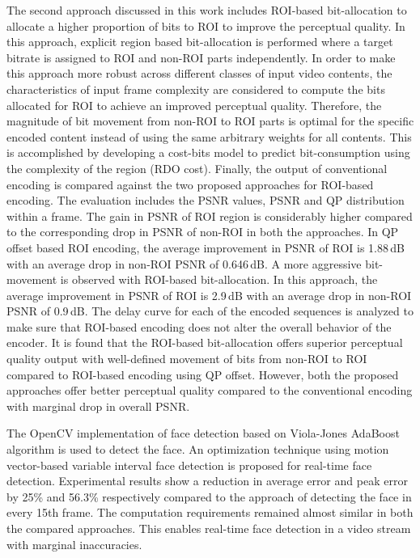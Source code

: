 The second approach discussed in this work includes ROI-based bit-allocation to allocate a higher proportion of bits to ROI to improve the perceptual quality. In this approach, explicit region based bit-allocation is performed where a target bitrate is assigned to ROI and non-ROI parts independently. In order to make this approach more robust across different classes of input video contents, the characteristics of input frame complexity are considered to compute the bits allocated for ROI to achieve an improved perceptual quality. Therefore, the magnitude of bit movement from non-ROI to ROI parts is optimal for the specific encoded content instead of using the same arbitrary weights for all contents. This is accomplished by developing a cost-bits model to predict bit-consumption using the complexity of the region (RDO cost). Finally, the output of conventional encoding is compared against the two proposed approaches for ROI-based encoding. The evaluation includes the PSNR values, PSNR and QP distribution within a frame. The gain in PSNR of ROI region is considerably higher compared to the corresponding drop in PSNR of non-ROI in both the approaches. In QP offset based ROI encoding, the average improvement in PSNR of ROI is 1.88\,dB with an average drop in non-ROI PSNR of 0.646\,dB. A more aggressive bit-movement is observed with ROI-based bit-allocation. In this approach, the average improvement in PSNR of ROI is 2.9\,dB with an average drop in non-ROI PSNR of 0.9\,dB. The delay curve for each of the encoded sequences is analyzed to make sure that ROI-based encoding does not alter the overall behavior of the encoder. It is found that the ROI-based bit-allocation offers superior perceptual quality output with well-defined movement of bits from non-ROI to ROI compared to ROI-based encoding using QP offset. However, both the proposed approaches offer better perceptual quality compared to the conventional encoding with marginal drop in overall PSNR.

The OpenCV implementation of face detection based on Viola-Jones AdaBoost algorithm is used to detect the face. An optimization technique using motion vector-based variable interval face detection is proposed for real-time face detection. Experimental results show a reduction in average error and peak error by 25\% and 56.3\% respectively compared to the approach of detecting the face in every 15th frame. The computation requirements remained almost similar in both the compared approaches. This enables real-time face detection in a video stream with marginal inaccuracies.

